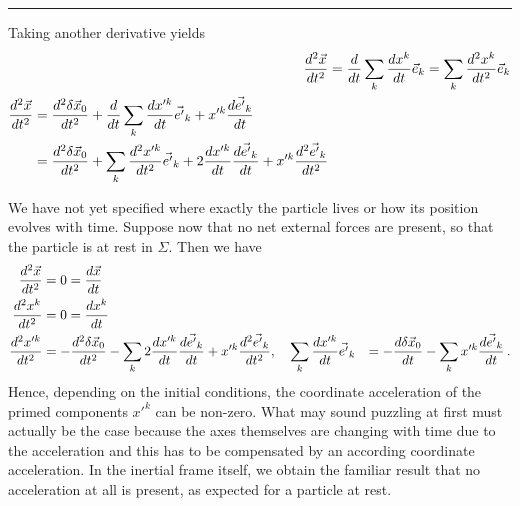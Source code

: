\documentclass[../class_mech_main.tex]{subfiles}
\begin{document}
\begin{itemize}
	\hrule


	Taking another derivative yields
	\begin{align}
		\dv[2]{\vec{x}}{t} &= \dv{t} \sum_k \dv{x^k}{t} \vec{e}_k
		= \sum_k \dv[2]{x^k}{t} \vec{e}_k
		\label{eq:acceleration_from_inert_frame_in_inert_frame}
		\\
		\begin{split}
			\dv[2]{\vec{x}}{t} &= \dv[2]{\delta \vec{x}_0}{t} + \dv{t} \sum_k \dv{x'^k}{t} \vec{e'}_k + x'^k \dv{\vec{e'}_k}{t}
			\\
			&= \dv[2]{\delta \vec{x}_0}{t} + \sum_k \dv[2]{x'^k}{t} \vec{e'}_k + 2 \dv{x'^k}{t} \dv{\vec{e'}_k}{t} + x'^k \dv[2]{\vec{e'}_k}{t}
		\end{split}
		\label{eq:acceleration_from_inert_frame_in_accel_frame}
	\end{align}

	We have not yet specified where exactly the particle lives or how its position evolves with time. Suppose now that no net external forces are present, so that the particle is at rest in $\Sigma$. Then we have
	\begin{align*}
		\dv[2]{\vec{x}}{t} &= 0 = \dv{\vec{x}}{t}
		\\
		\dv[2]{x^k}{t} &= 0 = \dv{x^k}{t}
		\\
		\dv[2]{x'^k}{t} &= - \dv[2]{\delta \vec{x}_0}{t} - \sum_k 2 \dv{x'^k}{t} \dv{\vec{e'}_k}{t} + x'^k \dv[2]{\vec{e'}_k}{t},
		\quad \sum_k \dv{x'^k}{t} \vec{e'}_k &= - \dv{\delta \vec{x}_0}{t} - \sum_k x'^k \dv{\vec{e'}_k}{t}
		\, .
	\end{align*}
	Hence, depending on the initial conditions, the coordinate acceleration of the primed components $x'^k$ can be non-zero. What may sound puzzling at first must actually be the case because the axes themselves are changing with time due to the acceleration and this has to be compensated by an according coordinate acceleration. In the inertial frame itself, we obtain the familiar result that no acceleration at all is present, as expected for a particle at rest.



\end{itemize}
\end{document}
